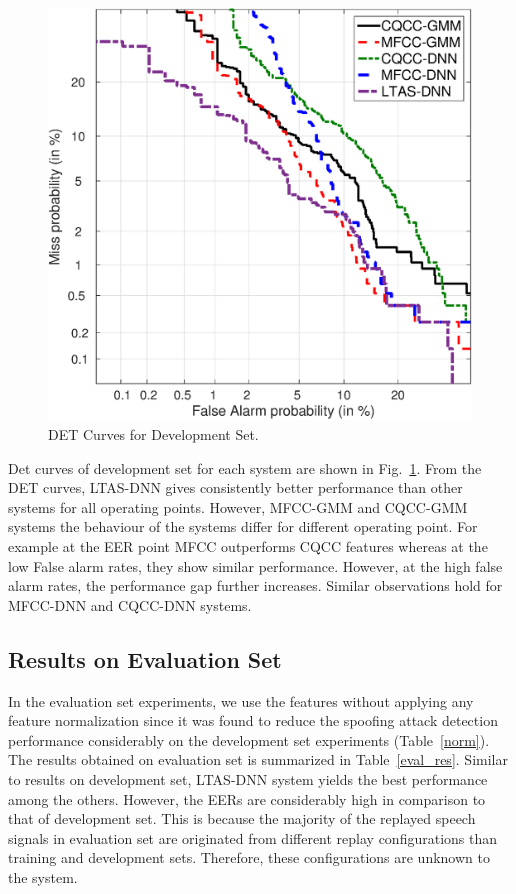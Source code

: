 \documentclass{article}
\begin{document}
\begin{figure}[!t]
    \centering
    \includegraphics[scale=0.3]{./Images/development-det-curves.eps}
    \caption{DET Curves for Development Set.}
    \label{dev_det}
\end{figure}

Det curves of development set for each system are shown in Fig.~\ref{dev_det}. From the DET curves, LTAS-DNN gives
consistently better performance than other systems for all operating points. However, MFCC-GMM and CQCC-GMM systems
the behaviour of the systems differ for different operating point. For example at the EER point MFCC outperforms CQCC
features whereas at the low False alarm rates, they show similar performance. However, at the high false alarm rates,
the performance gap further increases. Similar observations hold for MFCC-DNN and CQCC-DNN systems.

\subsection{Results on Evaluation Set}
In the evaluation set experiments, we use the features without applying any feature normalization since it was found
to reduce the spoofing attack detection performance considerably on the development set experiments (Table~\ref{norm}).
The results obtained on evaluation set is summarized in Table~\ref{eval_res}. Similar to results on development set,
LTAS-DNN system yields the best performance among the others. However, the EERs are considerably high in comparison to
that of development set. This is because the majority of the replayed speech signals in evaluation set are originated
from different replay configurations than training and development sets. Therefore, these configurations are unknown
to the system.
\end{document}
